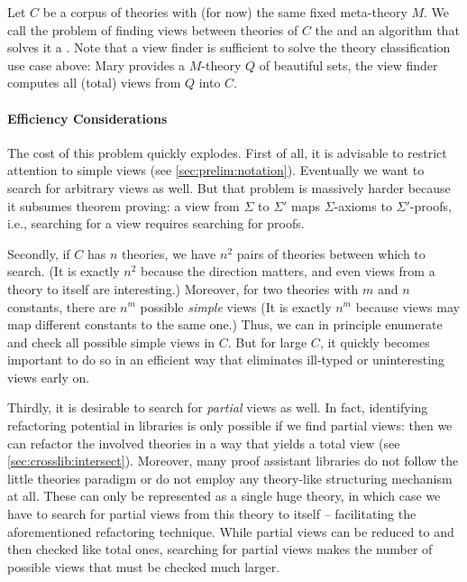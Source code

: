 Let $C$ be a corpus of theories with (for now) the same fixed meta-theory $M$.
We call the problem of finding views between theories of $C$ the  and an algorithm that solves it a . 
Note that a view finder is sufficient to solve the theory classification use case above: 
Mary provides a $M$-theory $Q$ of beautiful sets, the view finder computes all (total) views from $Q$ into $C$.

\paragraph{Efficiency Considerations}
The cost of this problem quickly explodes.
First of all, it is advisable to restrict attention to simple views (see \autoref{sec:prelim:notation}).
Eventually we want to search for arbitrary views as well.
But that problem is massively harder because it subsumes theorem proving: a view from $\Sigma$ to $\Sigma'$ maps $\Sigma$-axioms to $\Sigma'$-proofs, i.e., searching for a view requires searching for proofs.

Secondly, if $C$ has $n$ theories, we have $n^2$ pairs of theories between which to search.
(It is exactly $n^2$ because the direction matters, and even views from a theory to itself are interesting.)
Moreover, for two theories with $m$ and $n$ constants, there are $n^m$ possible \emph{simple} views
(It is exactly $n^m$ because views may map different constants to the same one.)
Thus, we can in principle enumerate and check all possible simple views in $C$.
But for large $C$, it quickly becomes important to do so in an efficient way that eliminates ill-typed or uninteresting views early on.

Thirdly, it is desirable to search for \emph{partial} views as well.
In fact, identifying refactoring potential in libraries is only possible if we find partial views: then we can refactor the involved theories in a way that yields a total view (see \autoref{sec:crosslib:intersect}).
Moreover, many proof assistant libraries do not follow the little theories paradigm or do not employ any theory-like structuring mechanism at all.
These can only be represented as a single huge theory, in which case we have to search for partial views from this theory to itself -- facilitating the aforementioned refactoring technique.
While partial views can be reduced to and then checked like total ones, searching for partial views makes the number of possible views that must be checked much larger.

